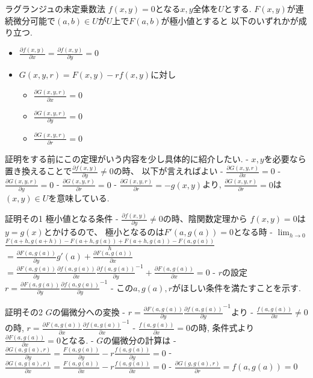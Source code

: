 \documentclass{ujarticle}
\begin{document}
\begin{thm}
ラグランジュの未定乗数法
$f(x ,y) = 0$となる$x, y$全体を$U$とする.
$F(x, y)$が連続微分可能で$(a, b) \in U$が$U$上で$F(a, b)$が極小値とすると
  以下のいずれかが成り立つ.
 \begin{itemize}
  \item $\frac{\partial f(x, y)}{\partial x} = \frac{\partial f(x, y)}{\partial y} = 0$
  \item $G(x, y, r) = F(x, y) - r f(x, y)$に対し
  \begin{itemize}
    \item $\frac{\partial G(x, y, r)}{\partial x} = 0$
    \item $\frac{\partial G(x, y, r)}{\partial y} = 0$
    \item $\frac{\partial G(x, y, r)}{\partial r} = 0$
  \end{itemize}
 \end{itemize}
\end{thm}
証明をする前にこの定理がいう内容を少し具体的に紹介したい.
- $x, y$を必要なら置き換えることで$\frac{\partial f(x, y)}{\partial y} \neq 0$の時、
  以下が言えればよい
  - $\frac{\partial G(x, y, r)}{\partial x} = 0$
  - $\frac{\partial G(x, y, r)}{\partial y} = 0$
  - $\frac{\partial G(x, y, r)}{\partial r} = 0$
- $\frac{\partial G(x, y, r)}{\partial r} = - g(x, y)$より,
  $\frac{\partial G(x, y, r)}{\partial r} = 0$は$(x ,y) \in U$を意味している.


証明その1 極小値となる条件
- $\frac{\partial f(x, y)}{\partial y} \neq 0$の時、陰関数定理から
  $f(x, y) = 0$は$y = g(x)$とかけるので、
  極小となるのは$F'(a, g(a)) = 0$となる時
- $\displaystyle \lim_{h \to 0}$ $\frac{F(a + h, g(a+h)) - F(a+h, g(a)) + F(a+h, g(a)) - F(a,g(a))}{h}$
  $= \frac{\partial F(a, g(a))}{\partial y} g'(a) + \frac{\partial F(a, g(a))}{\partial x}$
  $= \frac{\partial F(a, g(a))}{\partial y} \frac{\partial f(a, g(a))}{\partial x} \frac{\partial f(a, g(a))}{\partial y}^{-1} + \frac{\partial F(a, g(a))}{\partial x} = 0$
- $r$の設定
  $r= \frac{\partial F(a, g(a))}{\partial y} \frac{\partial f(a, g(a))}{\partial y}^{-1}$
- この$a, g(a), r$がほしい条件を満たすことを示す.


証明その2 $G$の偏微分への変換
- $r= \frac{\partial F(a, g(a))}{\partial y} \frac{\partial f(a, g(a))}{\partial y}^{-1}$より
  - $\frac{f(a, g(a))}{\partial x} \neq 0$の時, $r= \frac{\partial F(a, g(a))}{\partial x} \frac{\partial f(a, g(a))}{\partial x}^{-1}$
  - $\frac{f(a, g(a))}{\partial x} = 0$の時, 条件式より$\frac{\partial F(a, g(a))}{\partial x} = 0$となる.
- $G$の偏微分の計算は
  - $\frac{\partial G(a, g(a), r)}{\partial y} = \frac{F(a, g(a))}{\partial y} - r \frac{f(a, g(a))}{\partial y} = 0$
  - $\frac{\partial G(a, g(a), r)}{\partial x} = \frac{F(a, g(a))}{\partial x} - r \frac{f(a, g(a))}{\partial x} = 0$
  - $\frac{\partial G(g, g(a), r)}{\partial r} = f(a, g(a)) = 0$
\end{document}
